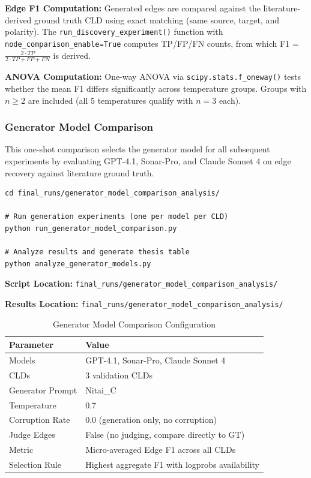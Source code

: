 \textbf{Edge F1 Computation:} Generated edges are compared against the literature-derived ground truth CLD using exact matching (same source, target, and polarity). The \texttt{run\_discovery\_experiment()} function with \texttt{node\_comparison\_enable=True} computes TP/FP/FN counts, from which F1 = $\frac{2 \cdot TP}{2 \cdot TP + FP + FN}$ is derived.

\textbf{ANOVA Computation:} One-way ANOVA via \texttt{scipy.stats.f\_oneway()} tests whether the mean F1 differs significantly across temperature groups. Groups with $n \geq 2$ are included (all 5 temperatures qualify with $n=3$ each).

\subsubsection{Generator Model Comparison}
\label{sec:generator_comparison}

This one-shot comparison selects the generator model for all subsequent experiments by evaluating GPT-4.1, Sonar-Pro, and Claude Sonnet 4 on edge recovery against literature ground truth.

\begin{verbatim}
cd final_runs/generator_model_comparison_analysis/

# Run generation experiments (one per model per CLD)
python run_generator_model_comparison.py

# Analyze results and generate thesis table
python analyze_generator_models.py
\end{verbatim}

\textbf{Script Location:} \texttt{final\_runs/generator\_model\_comparison\_analysis/}

\textbf{Results Location:} \texttt{final\_runs/generator\_model\_comparison\_analysis/}

\begin{table}[H]
\centering
\caption{Generator Model Comparison Configuration}
\label{tab:generator_comparison_config}
\footnotesize
\begin{tabular}{@{}ll@{}}
\toprule
\textbf{Parameter} & \textbf{Value} \\
\midrule
Models & GPT-4.1, Sonar-Pro, Claude Sonnet 4 \\
CLDs & 3 validation CLDs \\
Generator Prompt & Nitai\_C \\
Temperature & 0.7 \\
Corruption Rate & 0.0 (generation only, no corruption) \\
Judge Edges & False (no judging, compare directly to GT) \\
\midrule
Metric & Micro-averaged Edge F1 across all CLDs \\
Selection Rule & Highest aggregate F1 with logprobs availability \\
\bottomrule
\end{tabular}
\end{table}

